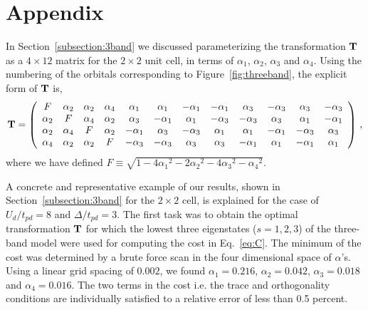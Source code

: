\section*{Appendix}
In Section~\ref{subsection:3band} we discussed parameterizing the transformation ${\bf T}$ 
as a $4\times12$ matrix for the $2 \times 2$ unit cell, in terms of $\alpha_1$, $\alpha_2$, $\alpha_3$ 
and $\alpha_4$. Using the numbering of the orbitals corresponding to Figure~\ref{fig:threeband}, 
the explicit form of ${\bf T}$ is,
\begin{eqnarray}
{\bf T} = 
\left(
\begin{array}{cccccccccccc}
F        & \alpha_2 &        \alpha_2 &  \alpha_4 & \alpha_1 & \alpha_1 & -\alpha_1 & -\alpha_1 & \alpha_3 & -\alpha_3 & \alpha_3 & -\alpha_3 \\
\alpha_2 &  F       &        \alpha_4 &  \alpha_2 & \alpha_3 & -\alpha_1 & \alpha_1 & -\alpha_3 & -\alpha_3 & \alpha_3 & \alpha_1 & -\alpha_1 \\
\alpha_2 & \alpha_4 & F               &  \alpha_2 & -\alpha_1 & \alpha_3 & -\alpha_3 & \alpha_1 & \alpha_1 & -\alpha_1 & -\alpha_3 & \alpha_3 \\
\alpha_4 & \alpha_2 & \alpha_2        &   F       & -\alpha_3 & -\alpha_3 & \alpha_3 & \alpha_3 & -\alpha_1 & \alpha_1 & -\alpha_1 & \alpha_1 \\
\end{array}
\right)\,,
\end{eqnarray}
where we have defined $F \equiv \sqrt{1-4{\alpha_1}^2 - 2{\alpha_2}^2 - 4 {\alpha_3}^2 -{\alpha_4}^2}$.

A concrete and representative example of our results, shown in Section~\ref{subsection:3band} 
for the $2\times2$ cell, is explained for the case of $U_d/t_{pd}=8$ and $\Delta/t_{pd}=3$. 
The first task was to obtain the optimal transformation ${\bf T}$ 
for which the lowest three eigenstates ($s=1,2,3$) of the three-band model were used for 
computing the cost in Eq.~\eqref{eq:C}. The minimum of the cost was 
determined by a brute force scan in the four dimensional space of $\alpha$'s. 
Using a linear grid spacing of $0.002$, we found $\alpha_1=0.216$, $\alpha_2=0.042$, $\alpha_3=0.018$ and $\alpha_4=0.016$. 
The two terms in the cost i.e. the trace and orthogonality conditions are individually satisfied to a relative error of 
less than 0.5 percent. 

